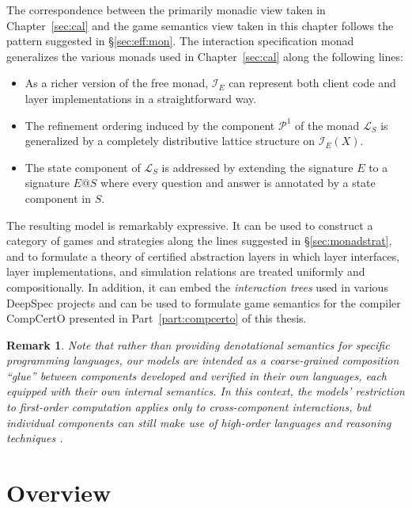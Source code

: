 \documentclass[11pt,oneside]{book}
\newtheorem{remark}[theorem]{Remark}
\theoremstyle{definition}
\begin{document}
The correspondence
between the primarily monadic view taken in Chapter~\ref{sec:cal}
and the game semantics view taken in this chapter
follows the pattern suggested in \S\ref{sec:eff:mon}.
The interaction specification monad
generalizes the various monads used in Chapter~\ref{sec:cal}
along the following lines:
\begin{itemize}
  \item
    As a richer version of the free monad,
    $\mathcal{I}_E$ can represent
    both client code and layer implementations
    in a straightforward way.
  \item
    The refinement ordering induced by
    the component $\mathcal{P}^1$ of the monad $\mathcal{L}_S$
    is generalized by a completely distributive lattice structure
    on $\mathcal{I}_E(X)$.
  \item
    The state component of $\mathcal{L}_S$
    is addressed by extending the signature $E$
    to a signature $E@S$ where
    every question and answer is annotated by
    a state component in $S$.
\end{itemize}
The resulting model is remarkably expressive.
It can be used to construct
a category of games and strategies along the lines suggested in
\S\ref{sec:monadstrat},
and to formulate a theory of certified abstraction
layers in which
layer interfaces, layer implementations, and simulation relations
are treated uniformly and compositionally.
In addition,
it can embed the \emph{interaction trees}
used in various DeepSpec projects \citep{itree}
and can be used to formulate game semantics
for the compiler CompCertO
presented in Part~\ref{part:compcerto} of this thesis.

\begin{remark}
Note that rather than providing
denotational semantics for specific programming
languages, our models are intended as a coarse-grained composition
``glue'' between components developed and verified in their own
languages, each equipped with their own internal semantics.
In this context,
the models' restriction to first-order computation
applies only to cross-component interactions,
but individual components can still make use of
high-order languages and reasoning techniques
\citep{hosl-fo}.
\end{remark}


\section{Overview} %
\end{document}

